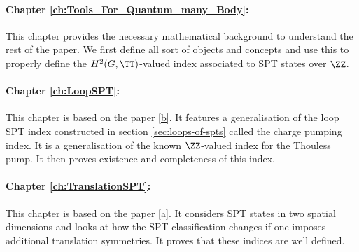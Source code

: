 \paragraph{Chapter \ref{ch:Tools_For_Quantum_many_Body}:}This chapter provides the necessary mathematical background to understand the rest of the paper. We first define all sort of objects and concepts and use this to properly define the $H^2(G,\TT)$-valued index associated to SPT states over $\ZZ$.
\paragraph{Chapter \ref{ch:LoopSPT}:}This chapter is based on the paper \hyperref[mySecondPaper]{[b]}. It features a generalisation of the loop SPT index constructed in section \ref{sec:loops-of-spts} called the charge pumping index. It is a generalisation of the known $\ZZ$-valued index for the Thouless pump. It then proves existence and completeness of this index.
\paragraph{Chapter \ref{ch:TranslationSPT}:}This chapter is based on the paper \hyperref[myFirstPaper]{[a]}. It considers SPT states in two spatial dimensions and looks at how the SPT classification changes if one imposes additional translation symmetries. It proves that these indices are well defined.

\cleardoublepage

